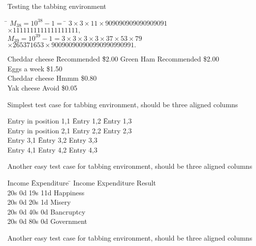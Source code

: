 \documentclass{article}
\begin{document}
Testing the tabbing environment

\begin{table}
\begin{center}
\begin{tabbing}
\hspace*{1cm}\= $M_{38}=10^{38}-1=$ \= $3\times 3 \times 11 \times 909090909090909091$\\
                \>                     \> $\times 1111111111111111111,$\\
                \> $M_{39}= 10^{39}-1= 3 \times 3 \times 3 \times 3 \times 37 \times 53 \times 79$\\ 
                \>                     \> $\times 265371653 \times 900900900900990990990991.$
\end{tabbing}
\end{center}
\end{table}


\begin{table}
\begin{center}
\begin{tabbing}
Cheddar cheese \= Recommended \= \$2.00 \kill
Green Ham \> Recommended \> \$2.00      \\
Eggs  a week \> \$1.50              \\
Cheddar cheese \> Hmmm \> \$0.80        \\
Yak cheese \> Avoid \> \$0.05
\end{tabbing}
\caption{Simplest test case for tabbing environment, should be
three aligned columns}
\end{center}
\end{table}

\begin{table}
\begin{center}
\begin{tabbing}
Entry in position 1,1 \= Entry 1,2 \= Entry 1,3\\
Entry in position 2,1 \> Entry 2,2 \> Entry 2,3\\
Entry 3,1 \= Entry 3,2 \> Entry 3,3            \\
Entry 4,1 \> Entry 4,2 \> Entry 4,3
\end{tabbing}
\caption{Another easy test case for tabbing environment, should be
three aligned columns}
\end{center}
\end{table}

\begin{table}
\begin{center}
\begin{tabbing}
Income \=Expenditure \=    \kill
Income \>Expenditure \>Result \\
20s 0d \>19s 11d \>Happiness   \\
20s 0d \>20s 1d  \>Misery    \\
20s 0d \>40s 0d  \>Bancruptcy    \\
20s 0d \>80s 0d  \>Government    \\
\end{tabbing}
\caption{Another easy test case for tabbing environment, should be
three aligned columns}
\end{center}
\end{table}
\end{document}
